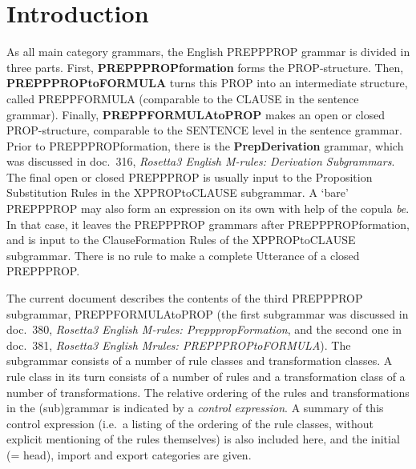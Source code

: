 
   \RosSupersedes{-}
   \MakeRosTitle
%
%

\section{Introduction}
As all main category grammars, the English PREPPPROP grammar is divided in 
three parts. First, {\bf PREPPPROPformation} forms the PROP-structure. Then, {
\bf PREPPPROPtoFORMULA} turns this PROP into an intermediate structure, called 
PREPPFORMULA
(comparable to the CLAUSE in the sentence grammar). Finally, {\bf 
PREPPFORMULAtoPROP} makes an open or closed PROP-structure, comparable to the 
SENTENCE level in the sentence grammar. Prior to PREPPPROPformation, there is 
the {\bf PrepDerivation} grammar, which was discussed in doc.\ 316, {\em 
Rosetta3 English M-rules: Derivation Subgrammars\/}. The final open or closed 
PREPPPROP is usually input to the Proposition Substitution Rules in the 
XPPROPtoCLAUSE subgrammar. A `bare' PREPPPROP may also form an expression on 
its own with help of the copula {\em be\/}. In that case, it leaves the 
PREPPPROP grammars after PREPPPROPformation, and 
is input to the ClauseFormation Rules of the XPPROPtoCLAUSE subgrammar. 
There is no rule to make a complete Utterance of a closed PREPPPROP.

The current document describes the contents of the third PREPPPROP subgrammar, 
PREPPFORMULAtoPROP (the first subgrammar was discussed in doc.\ 380, {\em 
Rosetta3 English M-rules: PrepppropFormation\/}, and the second one 
in doc.\ 381, {\em Rosetta3 English Mrules: PREPPPROPtoFORMULA\/}). 
The subgrammar consists of 
a number of rule classes and transformation classes. A rule class in its turn
consists of a number of rules and a transformation class of a number of 
transformations. The relative ordering of the rules and transformations in the
(sub)grammar is indicated by a {\em control expression}. A summary of this
control expression (i.e.\ a listing of the ordering of the rule classes, 
without explicit mentioning of the rules themselves) is also included here, 
and the initial (= head), import and export categories are given. 

